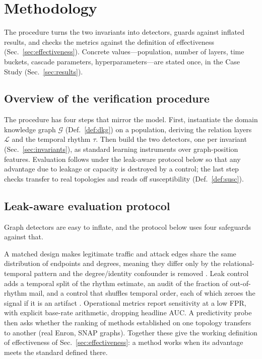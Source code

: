\section{Methodology}
\label{sec:method}

The procedure turns the two invariants into detectors, guards against inflated results, and checks the
metrics against the definition of effectiveness (Sec.~\ref{sec:effectiveness}). Concrete values---population, number of layers, time buckets, cascade parameters, hyperparameters---are stated once, in the
Case Study (Sec.~\ref{sec:results}).

\subsection{Overview of the verification procedure}
\label{sec:m-overview}
The procedure has four steps that mirror the model. First, instantiate the domain knowledge graph
$\mathcal{G}$ (Def.~\ref{def:dkg}) on a population, deriving the relation layers $\mathcal{L}$ and the temporal
rhythm $\tau$. Then build the two detectors, one per invariant (Sec.~\ref{sec:invariants}), as standard
learning instruments over graph-position features. Evaluation follows under the leak-aware protocol below so that any advantage due to leakage or capacity is destroyed by a control; the last step checks transfer to real
topologies and reads off susceptibility (Def.~\ref{def:susc}).

\subsection{Leak-aware evaluation protocol}
\label{sec:eval}
Graph detectors are easy to inflate, and the protocol below uses four safeguards against that.

A matched design makes legitimate traffic and attack edges share the same
distribution of endpoints and degrees, meaning they differ only by the relational-temporal pattern and the
degree/identity confounder is removed \citep{arp2022dos}. Leak control adds a temporal split of the rhythm
estimate, an audit of the fraction of out-of-rhythm mail, and a control that shuffles temporal order, each of
which zeroes the signal if it is an artifact \citep{pendlebury2019tesseract}. Operational metrics report
sensitivity at a low FPR, with explicit base-rate arithmetic, dropping headline AUC. A predictivity probe then
asks whether the ranking of methods established on one topology transfers to another (real Enron, SNAP graphs).
Together these give the working definition of effectiveness of Sec.~\ref{sec:effectiveness}: a method works when
its advantage meets the standard defined there.

